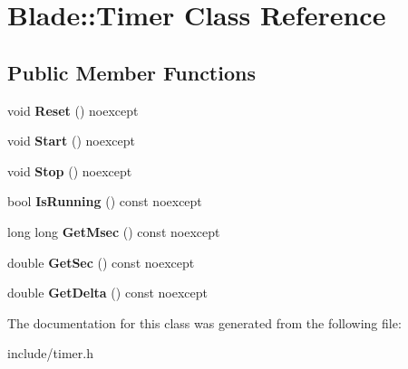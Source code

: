 \hypertarget{class_blade_1_1_timer}{}\section{Blade\+:\+:Timer Class Reference}
\label{class_blade_1_1_timer}
\subsection*{Public Member Functions}
\begin{DoxyCompactItemize}
\item 
\mbox{\label{class_blade_1_1_timer_a8f8bdd37bd6c4c6fe0badc8b3de5151c}} 
void {\bfseries Reset} () noexcept
\item 
\mbox{\label{class_blade_1_1_timer_aaca827063f16e238be127ad0cc8b022c}} 
void {\bfseries Start} () noexcept
\item 
\mbox{\label{class_blade_1_1_timer_a9049289e8c49255bd46e5d070e8f92e0}} 
void {\bfseries Stop} () noexcept
\item 
\mbox{\label{class_blade_1_1_timer_ae5e5bf6cdb995dbeb15cb94d87026809}} 
bool {\bfseries Is\+Running} () const noexcept
\item 
\mbox{\label{class_blade_1_1_timer_a83e1a3a261b33dff4e361c5eb8a7f4d8}} 
long long {\bfseries Get\+Msec} () const noexcept
\item 
\mbox{\label{class_blade_1_1_timer_abd1d2fce63f777d7c5a8557b87533cbd}} 
double {\bfseries Get\+Sec} () const noexcept
\item 
\mbox{\label{class_blade_1_1_timer_af099ed32b18b31459e4597df10ad2c7f}} 
double {\bfseries Get\+Delta} () const noexcept
\end{DoxyCompactItemize}


The documentation for this class was generated from the following file\+:\begin{DoxyCompactItemize}
\item 
include/timer.\+h\end{DoxyCompactItemize}
